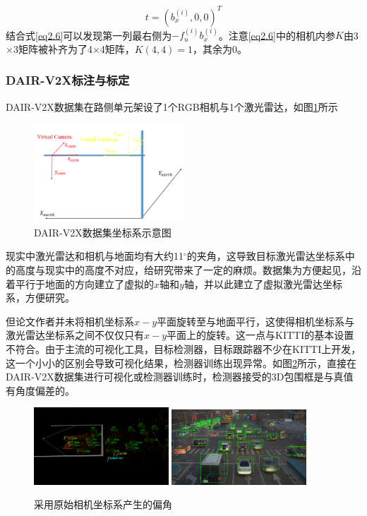 \begin{equation}
    t=(b_x^{(i)},0,0)^T
\end{equation}
结合式\eqref{eq2.6}可以发现第一列最右侧为$-f_{u}^{(i)} b_{x}^{(i)}$。注意\eqref{eq2.6}中的相机内参$K$由3$\times$3矩阵被补齐为了4$\times$4矩阵，$K(4,4)=1$，其余为0。

\subsubsection{DAIR-V2X标注与标定}

DAIR-V2X数据集在路侧单元架设了1个RGB相机与1个激光雷达，如图\ref{fig6}所示

\begin{figure}[htb] 
    \center
    \includegraphics[width=0.5\textwidth]{figure/fig6.png}
    \caption{DAIR-V2X数据集坐标系示意图}
    \label{fig6}
\end{figure}

现实中激光雷达和相机与地面均有大约11$^\circ$的夹角，这导致目标激光雷达坐标系中的高度与现实中的高度不对应，给研究带来了一定的麻烦。数据集为方便起见，沿着平行于地面的方向建立了虚拟的$x$轴和$y$轴，并以此建立了虚拟激光雷达坐标系，方便研究。

但论文作者并未将相机坐标系$x-y$平面旋转至与地面平行，这使得相机坐标系与激光雷达坐标系之间不仅仅只有$x-y$平面上的旋转。这一点与KITTI的基本设置不符合。由于主流的可视化工具，目标检测器，目标跟踪器不少在KITTI上开发，这一个小小的区别会导致可视化结果，检测器训练出现异常。如图\ref{fig7}所示，直接在DAIR-V2X数据集进行可视化或检测器训练时，检测器接受的3D包围框是与真值有角度偏差的。

\begin{figure}[htb] 
    \center
    \includegraphics[width=0.45\textwidth]{figure/fig10.png}
    \includegraphics[width=0.45\textwidth]{figure/fig11.png}
    \caption{采用原始相机坐标系产生的偏角}
    \label{fig7}
\end{figure}

